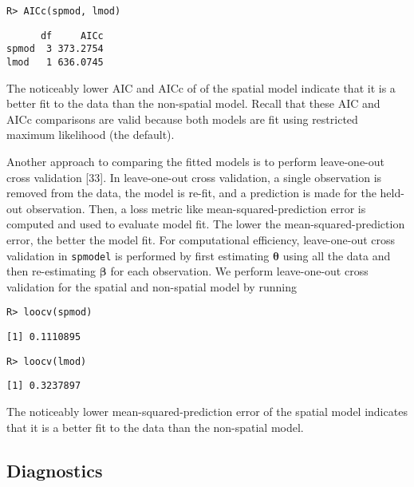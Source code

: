 \documentclass[10pt,letterpaper]{article}
\begin{document}
\begin{verbatim}
R> AICc(spmod, lmod)
\end{verbatim}

\begin{verbatim}
      df     AICc
spmod  3 373.2754
lmod   1 636.0745
\end{verbatim}

\noindent The noticeably lower AIC and AICc of of the spatial model
indicate that it is a better fit to the data than the non-spatial model.
Recall that these AIC and AICc comparisons are valid because both models
are fit using restricted maximum likelihood (the default).

Another approach to comparing the fitted models is to perform
leave-one-out cross validation {[}33{]}. In leave-one-out cross
validation, a single observation is removed from the data, the model is
re-fit, and a prediction is made for the held-out observation. Then, a
loss metric like mean-squared-prediction error is computed and used to
evaluate model fit. The lower the mean-squared-prediction error, the
better the model fit. For computational efficiency, leave-one-out cross
validation in \texttt{spmodel} is performed by first estimating
\(\boldsymbol{\theta}\) using all the data and then re-estimating
\(\boldsymbol{\beta}\) for each observation. We perform leave-one-out
cross validation for the spatial and non-spatial model by running

\begin{verbatim}
R> loocv(spmod)
\end{verbatim}

\begin{verbatim}
[1] 0.1110895
\end{verbatim}

\begin{verbatim}
R> loocv(lmod)
\end{verbatim}

\begin{verbatim}
[1] 0.3237897
\end{verbatim}

\noindent The noticeably lower mean-squared-prediction error of the
spatial model indicates that it is a better fit to the data than the
non-spatial model.

\hypertarget{diagnostics}{%
\subsection{Diagnostics}\label{diagnostics}}
\end{document}
